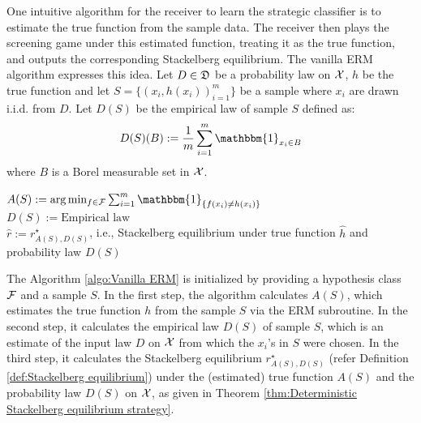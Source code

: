 One intuitive algorithm for the receiver to learn the strategic classifier is to estimate the true function from the sample data. The receiver then plays the screening game under this estimated function, treating it as the true function, and outputs the corresponding Stackelberg equilibrium. The vanilla ERM algorithm expresses this idea.
Let $D \in \mathfrak{D}$ be a probability law on $\mathcal{X}$, $h$ be the true function and let $S = \{(x_i, h(x_i))_{i=1}^m\}$ be a sample where $x_i$ are drawn i.i.d. from $D$. Let $D(S)$ be the empirical law of sample $S$ defined as:
\begin{equation}\label{eqn:empirical measure}
D(S)(B) := \frac{1}{m}\sum_{i=1}^m \mathbbm{1}_{x_i \in B}  
\end{equation}
where $B$ is a Borel measurable set in $\mathcal{X}$. 

\begin{center}
	\begin{algorithm2e}[H]\label{algo:Vanilla ERM}
		\SetAlgoLined
		\DontPrintSemicolon
		
		\BlankLine
		$A(S) := \arg\min_{f \in \cg{F}} \sum_{i=1}^m \mathbbm{1}_{\{f(x_i) \neq h(x_i)\}}$\\
		$D(S) :=\text{Empirical law }$ \\
		\BlankLine
		$\hat{r} := r^\star_{A(S),D(S)}$, i.e., Stackelberg equilibrium under true function $\hat{h}$ and probability law $D(S)$\;
		\caption{Vanilla ERM algorithm}
	\end{algorithm2e}
\end{center}

The Algorithm \ref{algo:Vanilla ERM} is initialized by providing a hypothesis class $\mathcal{F}$ and a sample $S$. In the first step, the algorithm calculates $A(S)$, which estimates the true function $h$ from the sample $S$ via the ERM subroutine. In the second step, it calculates the empirical law $D(S)$ of sample $S$, which is an estimate of the input law $D$ on $\mathcal{X}$ from which the $x_i$'s in $S$ were chosen. In the third step, it calculates the Stackelberg equilibrium $r^\star_{A(S),D(S)}$ (refer Definition \ref{def:Stackelberg equilibrium}) under the (estimated) true function $A(S)$ and the probability law $D(S)$ on $\mathcal{X}$, as given in Theorem \ref{thm:Deterministic Stackelberg equilibrium strategy}. 

